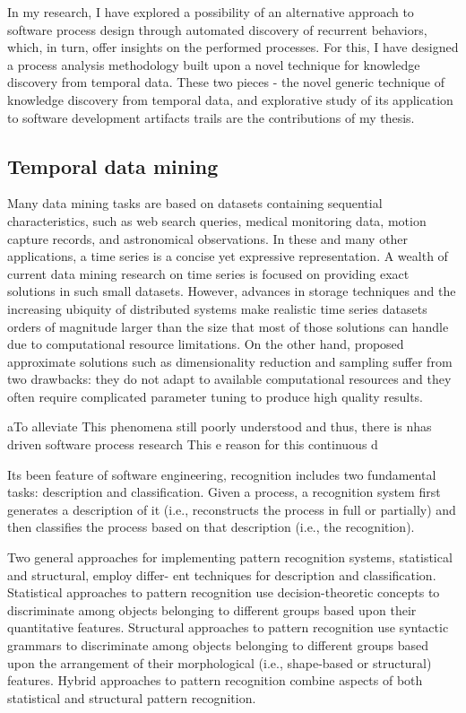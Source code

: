 \documentclass[11pt,oneside]{article}
\begin{document}
In my research, I have explored a possibility of an alternative approach to software 
process design through automated discovery of recurrent behaviors, which, in turn,
offer insights on the performed processes. For this, I have designed a process analysis 
methodology built upon a novel technique for knowledge discovery from temporal data. 
These two pieces - the novel generic technique of knowledge discovery from temporal data,
and explorative study of its application to software development artifacts trails are
the contributions of my thesis.

\subsection{Temporal data mining}
Many data mining tasks are based on datasets containing sequential characteristics, such
as web search queries, medical monitoring data, motion capture records, and astronomical
observations. In these and many other applications, a time series is a concise yet expressive
representation. A wealth of current data mining research on time series is focused on providing exact solutions in such small datasets. However, advances in storage techniques and
the increasing ubiquity of distributed systems make realistic time series datasets orders of
magnitude larger than the size that most of those solutions can handle due to computational
resource limitations. On the other hand, proposed approximate solutions such as dimensionality reduction and sampling suffer from two drawbacks: they do not adapt to available
computational resources and they often require complicated parameter tuning to produce high
quality results.

aTo alleviate This phenomena still poorly understood and thus, there is nhas driven software process research 
This e reason for this continuous d

Its been \cite{citeulike:11061107}
feature of software engineering, recognition includes two fundamental tasks: description and classification. Given
a process, a recognition system first generates a description of it (i.e., reconstructs the process in
full or partially) and then classifies the process based on that description (i.e., the recognition).

Two general approaches for implementing pattern recognition systems, statistical and structural, employ differ-
ent techniques for description and classification. Statistical approaches to pattern recognition use
decision-theoretic concepts to discriminate among objects belonging to different groups based upon
their quantitative features. Structural approaches to pattern recognition use syntactic grammars
to discriminate among objects belonging to different groups based upon the arrangement of their
morphological (i.e., shape-based or structural) features. Hybrid approaches to pattern recognition
combine aspects of both statistical and structural pattern recognition.
\end{document}
